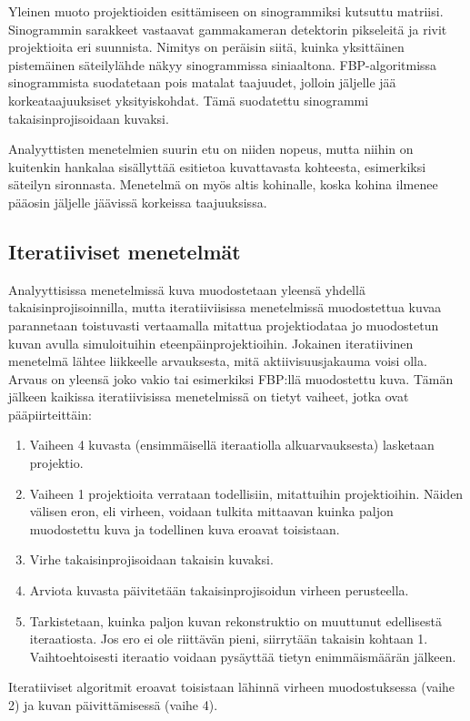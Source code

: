 Yleinen muoto projektioiden esittämiseen on sinogrammiksi kutsuttu matriisi. Sinogrammin sarakkeet vastaavat gammakameran detektorin pikseleitä ja rivit projektioita eri suunnista\cite{stiller_basics_2018}. Nimitys on peräisin siitä, kuinka yksittäinen pistemäinen säteilylähde näkyy sinogrammissa siniaaltona. FBP-algoritmissa sinogrammista suodatetaan pois matalat taajuudet, jolloin jäljelle jää korkeataajuuksiset yksityiskohdat. Tämä suodatettu sinogrammi takaisinprojisoidaan kuvaksi\cite{bruyant_analytic_2002}.

Analyyttisten menetelmien suurin etu on niiden nopeus, mutta niihin on kuitenkin hankalaa sisällyttää esitietoa kuvattavasta kohteesta, esimerkiksi säteilyn sironnasta. Menetelmä on myös altis kohinalle, koska kohina ilmenee pääosin jäljelle jäävissä korkeissa taajuuksissa.\cite{bruyant_analytic_2002, stiller_basics_2018}

\subsection{Iteratiiviset menetelmät}
Analyyttisissa menetelmissä kuva muodostetaan yleensä yhdellä takaisinprojisoinnilla, mutta iteratiiviisissa menetelmissä muodostettua kuvaa parannetaan toistuvasti vertaamalla mitattua projektiodataa jo muodostetun kuvan avulla simuloituihin eteenpäinprojektioihin. Jokainen iteratiivinen menetelmä lähtee liikkeelle arvauksesta, mitä aktiivisuusjakauma voisi olla. Arvaus on yleensä joko vakio tai esimerkiksi FBP:llä muodostettu kuva. Tämän jälkeen kaikissa iteratiivisissa menetelmissä on tietyt vaiheet, jotka ovat pääpiirteittäin\cite{bruyant_analytic_2002, beister_iterative_2012, stiller_basics_2018, ljungberg_spectct_2018}:
\begin{enumerate}[1.]
    \item Vaiheen 4 kuvasta (ensimmäisellä iteraatiolla alkuarvauksesta) lasketaan projektio. 
    \item Vaiheen 1 projektioita verrataan todellisiin, mitattuihin projektioihin. Näiden välisen eron, eli virheen, voidaan tulkita mittaavan kuinka paljon muodostettu kuva ja todellinen kuva eroavat toisistaan.
    \item Virhe takaisinprojisoidaan takaisin kuvaksi. 
    \item Arviota kuvasta päivitetään takaisinprojisoidun virheen perusteella.
    \item Tarkistetaan, kuinka paljon kuvan rekonstruktio on muuttunut edellisestä iteraatiosta. Jos ero ei ole riittävän pieni, siirrytään takaisin kohtaan 1. Vaihtoehtoisesti iteraatio voidaan pysäyttää tietyn enimmäismäärän jälkeen.
\end{enumerate}
Iteratiiviset algoritmit eroavat toisistaan lähinnä virheen muodostuksessa (vaihe 2) ja kuvan päivittämisessä (vaihe 4)\cite{bruyant_analytic_2002}.

